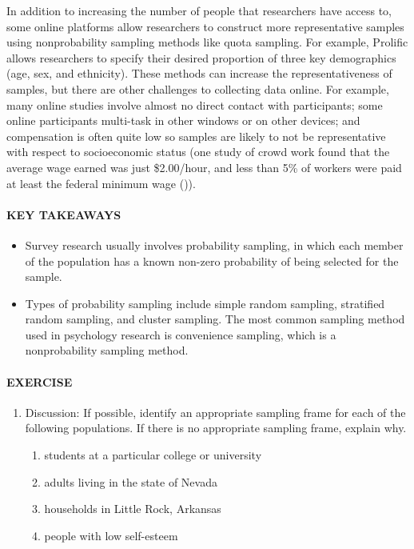 \documentclass[
]{krantz}
\providecommand{\tightlist}{%
  \setlength{\itemsep}{0pt}\setlength{\parskip}{0pt}}
\begin{document}
In addition to increasing the number of people that researchers have access to, some online platforms allow researchers to construct more representative samples using nonprobability sampling methods like quota sampling. For example, Prolific allows researchers to specify their desired proportion of three key demographics (age, sex, and ethnicity). These methods can increase the representativeness of samples, but there are other challenges to collecting data online. For example, many online studies involve almost no direct contact with participants; some online participants multi-task in other windows or on other devices; and compensation is often quite low so samples are likely to not be representative with respect to socioeconomic status (one study of crowd work found that the average wage earned was just \$2.00/hour, and less than 5\% of workers were paid at least the federal minimum wage ()).

\paragraph*{KEY TAKEAWAYS}\label{key-takeaways-12}

\begin{itemize}
\tightlist
\item
  Survey research usually involves probability sampling, in which each member of the population has a known non-zero probability of being selected for the sample.
\item
  Types of probability sampling include simple random sampling, stratified random sampling, and cluster sampling. The most common sampling method used in psychology research is convenience sampling, which is a nonprobability sampling method.
\end{itemize}

\paragraph*{EXERCISE}\label{exercise-1}

\begin{enumerate}
\def\labelenumi{\arabic{enumi}.}
\tightlist
\item
  Discussion: If possible, identify an appropriate sampling frame for each of the following populations. If there is no appropriate sampling frame, explain why.

  \begin{enumerate}
  \def\labelenumii{\alph{enumii}.}
  \tightlist
  \item
    students at a particular college or university
  \item
    adults living in the state of Nevada
  \item
    households in Little Rock, Arkansas
  \item
    people with low self-esteem
  \end{enumerate}
\end{enumerate}
\end{document}
